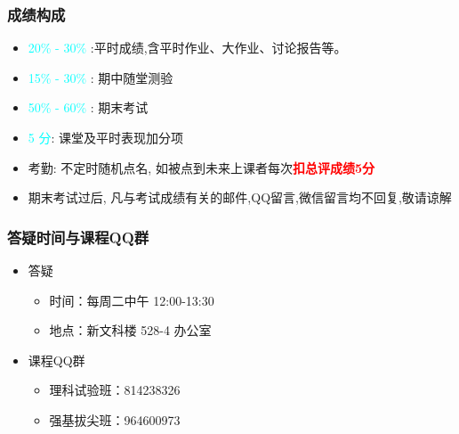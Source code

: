 \begin{frame}
	\frametitle{成绩构成}
	\begin{itemize}[<+-|alert@+>]
		\item {\rm  \textcolor{cyan}{20\% - 30\%}} :平时成绩,含平时作业、大作业、讨论报告等。
		\item  {\rm  \textcolor{cyan}{15\% - 30\%}}  : 期中随堂测验
		\item  {\rm  \textcolor{cyan}{50\% - 60\%}} : 期末考试
		\item \textcolor{cyan}{5 分}: 课堂及平时表现加分项
		\item 考勤: 不定时随机点名, 如被点到未来上课者每次\textcolor{red}{\bf 扣总评成绩5分}
		\item 期末考试过后, 凡与考试成绩有关的邮件,QQ留言,微信留言均不回复,敬请谅解
	\end{itemize}
\end{frame}

\begin{frame}
	\frametitle{答疑时间与课程{\rm QQ}群}
	\begin{itemize}[<+-|alert@+>]
		\item 答疑
		\begin{itemize}[<+-|alert@+>]
			\item 时间：每周二中午 12:00-13:30
			\item 地点：新文科楼 528-4 办公室
		\end{itemize}
		\item 课程{\rm QQ}群
		\begin{itemize}[<+-|alert@+>]
			\item 理科试验班：814238326
			\item 强基拔尖班：964600973
			\end{itemize}
	\end{itemize}
\end{frame}





